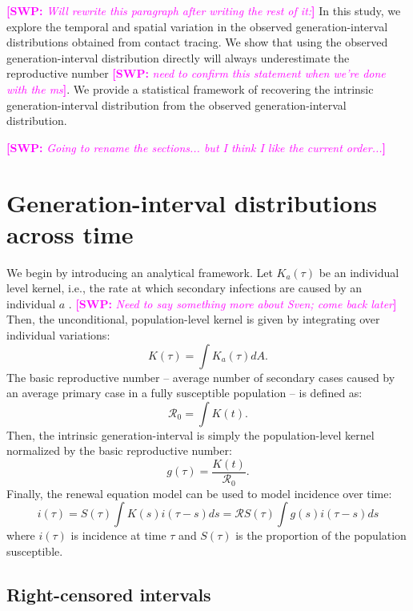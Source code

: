 \documentclass[12pt]{article}
\newcommand{\RR}{\ensuremath{{\mathcal R}}}
\newcommand{\comment}[3]{\textcolor{#1}{\textbf{[#2: }\textsl{#3}\textbf{]}}}
\newcommand{\swp}[1]{\comment{magenta}{SWP}{#1}}
\begin{document}
\swp{Will rewrite this paragraph after writing the rest of it:}
In this study, we explore the temporal and spatial variation in the observed generation-interval distributions obtained from contact tracing.
We show that using the observed generation-interval distribution directly will always underestimate the reproductive number \swp{need to confirm this statement when we're done with the ms}. 
We provide a statistical framework of recovering the intrinsic generation-interval distribution from the observed generation-interval distribution.

\swp{Going to rename the sections... but I think I like the current order...}
\section{Generation-interval distributions across time}

We begin by introducing an analytical framework.
Let $K_a(\tau)$ be an individual level kernel, i.e., the rate at which secondary infections are caused by an individual $a$ \citep{svensson2015influence}. \swp{Need to say something more about Sven; come back later}
Then, the unconditional, population-level kernel is given by integrating over individual variations:
\begin{equation}
K(\tau) = \int K_a (\tau) dA.
\end{equation}
The basic reproductive number -- average number of secondary cases caused by an average primary case in a fully susceptible population -- is defined as: 
\begin{equation}
\RR_0 = \int K(t).
\end{equation}
Then, the intrinsic generation-interval is simply the population-level kernel normalized by the basic reproductive number:
\begin{equation}
g(\tau) = \frac{K(t)}{\RR_0}.
\end{equation}
Finally, the renewal equation model can be used to model incidence over time:
\begin{equation}
i(\tau) = S(\tau) \int K(s) i(\tau-s) ds = \RR S(\tau) \int g(s) i(\tau-s) ds
\end{equation}
where $i(\tau)$ is incidence at time $\tau$ and $S(\tau)$ is the proportion of the population susceptible.

\subsection*{Right-censored intervals}
\end{document}
